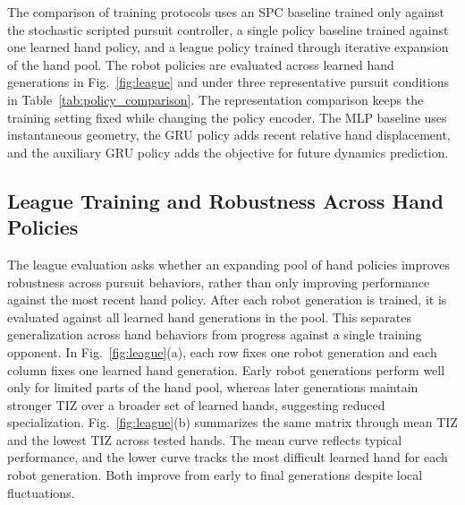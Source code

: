 \documentclass[journal,twoside,web]{ieeecolor2}
\begin{document}
The comparison of training protocols uses an SPC baseline trained only against the stochastic scripted pursuit controller, a single policy baseline trained against one learned hand policy, and a league policy trained through iterative expansion of the hand pool. The robot policies are evaluated across learned hand generations in Fig.~\ref{fig:league} and under three representative pursuit conditions in Table~\ref{tab:policy_comparison}. The representation comparison keeps the training setting fixed while changing the policy encoder. The MLP baseline uses instantaneous geometry, the GRU policy adds recent relative hand displacement, and the auxiliary GRU policy adds the objective for future dynamics prediction.

\subsection{League Training and Robustness Across Hand Policies}
The league evaluation asks whether an expanding pool of hand policies improves robustness across pursuit behaviors, rather than only improving performance against the most recent hand policy. After each robot generation is trained, it is evaluated against all learned hand generations in the pool. This separates generalization across hand behaviors from progress against a single training opponent. In Fig.~\ref{fig:league}(a), each row fixes one robot generation and each column fixes one learned hand generation. Early robot generations perform well only for limited parts of the hand pool, whereas later generations maintain stronger TIZ over a broader set of learned hands, suggesting reduced specialization. Fig.~\ref{fig:league}(b) summarizes the same matrix through mean TIZ and the lowest TIZ across tested hands. The mean curve reflects typical performance, and the lower curve tracks the most difficult learned hand for each robot generation. Both improve from early to final generations despite local fluctuations.
\end{document}
